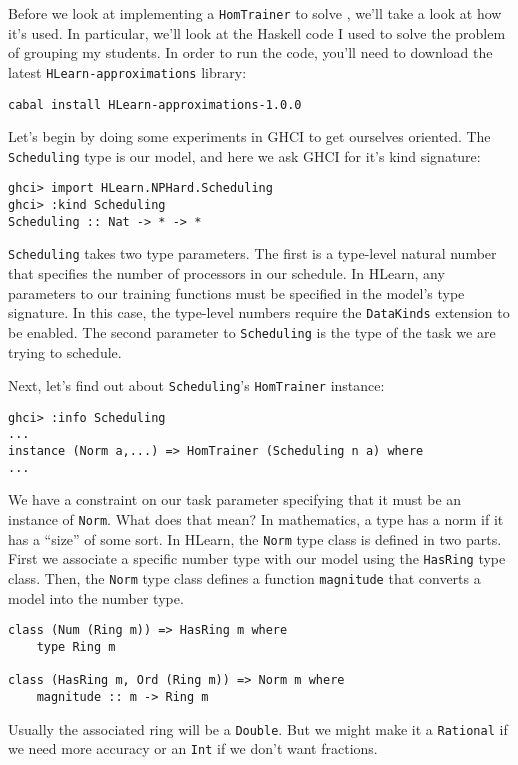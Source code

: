 \documentclass[tikz]{tmr}
\newcommand\h{\lstinline}
\newcommand{\prob}[1]{{\sc {#1}}}
\newcommand\+{\mdoubleplus}
\begin{document}
Before we look at implementing a \h{HomTrainer} to solve \prob{Scheduling}, we'll take a look at how it's used.
In particular, we'll look at the Haskell code I used to solve the problem of grouping my students.
In order to run the code, you'll need to download the latest \h{HLearn-approximations} library:

\begin{lstlisting}
cabal install HLearn-approximations-1.0.0
\end{lstlisting}

Let's begin by doing some experiments in GHCI to get ourselves oriented.
The \h{Scheduling} type is our model, and here we ask GHCI for it's kind signature:
\begin{lstlisting}
ghci> import HLearn.NPHard.Scheduling
ghci> :kind Scheduling
Scheduling :: Nat -> * -> *
\end{lstlisting}
\h{Scheduling} takes two type parameters.
The first is a type-level natural number that specifies the number of processors in our schedule.
In HLearn, any parameters to our training functions must be specified in the model's type signature.
In this case, the type-level numbers require the \h{DataKinds} extension to be enabled.
The second parameter to \h{Scheduling} is the type of the task we are trying to schedule.

Next, let's find out about \h{Scheduling}'s \h{HomTrainer} instance:
\begin{lstlisting}
ghci> :info Scheduling
...
instance (Norm a,...) => HomTrainer (Scheduling n a) where
...
\end{lstlisting}
We have a constraint on our task parameter specifying that it must be an instance of \h{Norm}.
What does that mean?
In mathematics, a type has a norm if it has a ``size'' of some sort.
In HLearn, the \h{Norm} type class is defined in two parts.
First we associate a specific number type with our model using the \h{HasRing} type class.
Then, the \h{Norm} type class defines a function \h{magnitude} that converts a model into the number type.
\begin{lstlisting}
class (Num (Ring m)) => HasRing m where
    type Ring m

class (HasRing m, Ord (Ring m)) => Norm m where
    magnitude :: m -> Ring m
\end{lstlisting}
Usually the associated ring will be a \h{Double}.
But we might make it a \h{Rational} if we need more accuracy or an \h{Int} if we don't want fractions.
\end{document}

